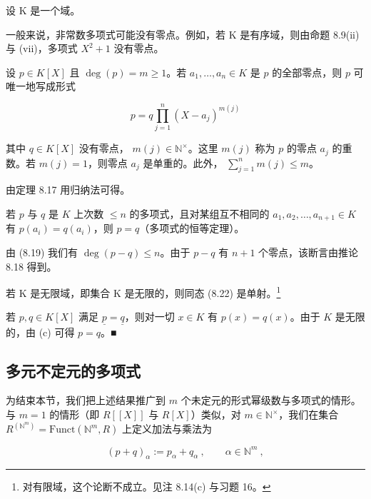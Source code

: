 \begin{remark}

设 K 是一个域。

\begin{items}
\item

一般来说，非常数多项式可能没有零点。例如，若 K 是有序域，则由命题 8.9(ii) 与 (vii)，多项式  $ X^{2} + 1 $ 没有零点。

\item

设  $ p \in K[X] $ 且  $ \deg(p) = m \geq 1 $。若  $ a_1, \ldots, a_n \in K $ 是  $ p $ 的全部零点，则  $ p $ 可唯一地写成形式

\[
p=q\prod_{j=1}^{n}(X-a_{j})^{m(j)}
\]

其中  $ q \in K[X] $ 没有零点， $ m(j) \in \mathbb{N}^\times $。这里  $ m(j) $ 称为  $ p $ 的零点  $ a_j $ 的重数。若  $ m(j) = 1 $，则零点  $ a_j $ 是单重的。此外， $ \sum_{j=1}^{n} m(j) \leq m $。

\proofhead
由定理 8.17 用归纳法可得。
\item

若 $p$ 与 $q$ 是 $K$ 上次数 $\leq n$ 的多项式，且对某组互不相同的 $a_1, a_2, \ldots, a_{n+1} \in K$ 有 $p(a_i) = q(a_i)$，则 $p = q$（多项式的恒等定理）。

\proofhead
由 (8.19) 我们有 $\deg(p - q) \leq n$。由于 $p - q$ 有 $n + 1$ 个零点，该断言由推论 8.18 得到。
\item

若 K 是无限域，即集合 K 是无限的，则同态 (8.22) 是单射。\footnote{对有限域，这个论断不成立。见注 8.14(c) 与习题 16。}

\proofhead
若 $p, q \in K[X]$ 满足 $\underline{p} = \underline{q}$，则对一切 $x \in K$ 有 $p(x) = q(x)$。由于 $K$ 是无限的，由 (c) 可得 $p = q$。■
\end{items}

\end{remark}

\subsection*{多元不定元的多项式}

为结束本节，我们把上述结果推广到 $m$ 个未定元的形式幂级数与多项式的情形。与 $m=1$ 的情形（即 $R[[X]]$ 与 $R[X]$）类似，对 $m\in\mathbb{N}^\times$，我们在集合 $R^{(\mathbb{N}^m)}=\mathrm{Funct}(\mathbb{N}^m,R)$ 上定义加法与乘法为

\begin{equation}
(p+q)_{\alpha}:=p_{\alpha}+q_{\alpha}~,\qquad\alpha\in\mathbb{N}^{m}~,
\end{equation}

